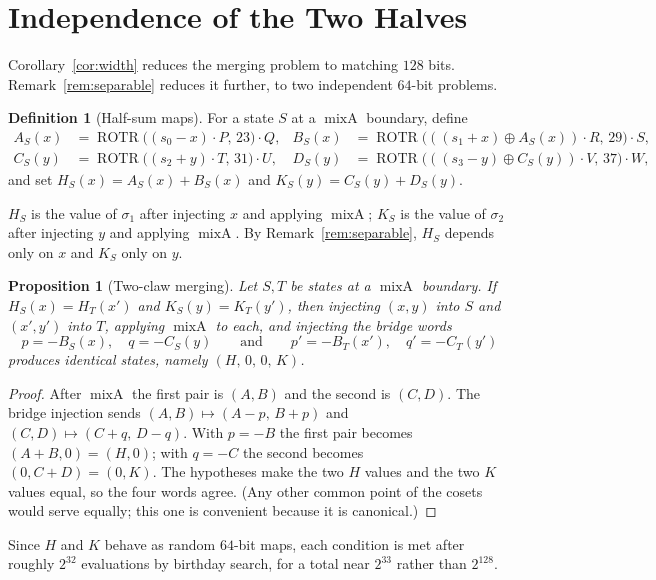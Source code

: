 \documentclass[10pt]{article}
\newtheorem{proposition}{Proposition}
\theoremstyle{definition}
\newtheorem{definition}{Definition}
\newcommand{\ROTR}{\operatorname{ROTR}}
\newcommand{\mixA}{\operatorname{mixA}}
\begin{document}
\section{Independence of the Two Halves}
\label{sec:independence}

Corollary~\ref{cor:width} reduces the merging problem to matching $128$ bits. Remark~\ref{rem:separable} reduces it further, to two independent $64$-bit problems.

\begin{definition}[Half-sum maps]
For a state $S$ at a $\mixA$ boundary, define
\begin{align*}
  A_S(x) &= \ROTR\big((s_0-x)\cdot P,\,23\big)\cdot Q, &
  B_S(x) &= \ROTR\big(((s_1+x)\oplus A_S(x))\cdot R,\,29\big)\cdot S,\\
  C_S(y) &= \ROTR\big((s_2+y)\cdot T,\,31\big)\cdot U, &
  D_S(y) &= \ROTR\big(((s_3-y)\oplus C_S(y))\cdot V,\,37\big)\cdot W,
\end{align*}
and set $H_S(x) = A_S(x) + B_S(x)$ and $K_S(y) = C_S(y) + D_S(y)$.
\end{definition}

$H_S$ is the value of $\sigma_1$ after injecting $x$ and applying $\mixA$; $K_S$ is the value of $\sigma_2$ after injecting $y$ and applying $\mixA$. By Remark~\ref{rem:separable}, $H_S$ depends only on $x$ and $K_S$ only on $y$.

\begin{proposition}[Two-claw merging]
\label{prop:twoclaw}
Let $S,T$ be states at a $\mixA$ boundary. If $H_S(x) = H_T(x')$ and $K_S(y) = K_T(y')$, then injecting $(x,y)$ into $S$ and $(x',y')$ into $T$, applying $\mixA$ to each, and injecting the bridge words
\[
  p = -B_S(x),\quad q = -C_S(y) \qquad\text{and}\qquad p' = -B_T(x'),\quad q' = -C_T(y')
\]
produces identical states, namely $(H,\,0,\,0,\,K)$.
\end{proposition}

\begin{proof}
After $\mixA$ the first pair is $(A,B)$ and the second is $(C,D)$. The bridge injection sends $(A,B)\mapsto(A-p,\,B+p)$ and $(C,D)\mapsto(C+q,\,D-q)$. With $p=-B$ the first pair becomes $(A+B,0)=(H,0)$; with $q=-C$ the second becomes $(0,C+D)=(0,K)$. The hypotheses make the two $H$ values and the two $K$ values equal, so the four words agree. (Any other common point of the cosets would serve equally; this one is convenient because it is canonical.)
\end{proof}

Since $H$ and $K$ behave as random $64$-bit maps, each condition is met after roughly $2^{32}$ evaluations by birthday search, for a total near $2^{33}$ rather than $2^{128}$.
\end{document}
